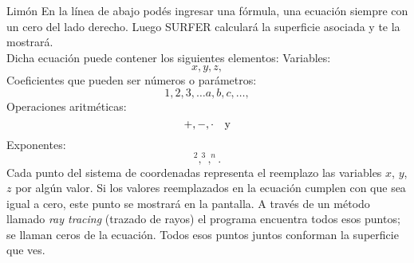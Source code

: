 \begin{surferPage}{Lim{\'o}n}
En la l{\'i}nea de abajo pod{\'e}s ingresar una f{\'o}rmula, una ecuaci{\'o}n siempre con un cero del lado derecho. Luego SURFER calcular{\'a} la superficie asociada y te la mostrar{\'a}. 
\\
Dicha ecuaci{\'o}n puede contener los siguientes elementos:
\newline
Variables:
\[x, y, z, \]
Coeficientes que pueden ser n{\'u}meros o par{\'a}metros:
\[1, 2, 3, \dots a, b, c, \dots, \]
Operaciones aritm{\'e}ticas:
\[+,  - , \cdot \quad \textnormal{y} \]
Exponentes:
\[ ^2, ^3, ^n .\]
Cada punto del sistema de coordenadas representa el reemplazo las variables $x$, $y$, $z$ por alg{\'u}n valor. Si los valores reemplazados en la ecuaci{\'o}n cumplen con que sea igual a cero, este punto se mostrar{\'a} en la pantalla. A trav{\'e}s de un m{\'e}todo llamado \textit{ray tracing} (trazado de rayos) el programa encuentra todos esos puntos; se llaman ceros de la ecuaci{\'o}n. Todos esos puntos juntos conforman la superficie que ves.
\end{surferPage}
